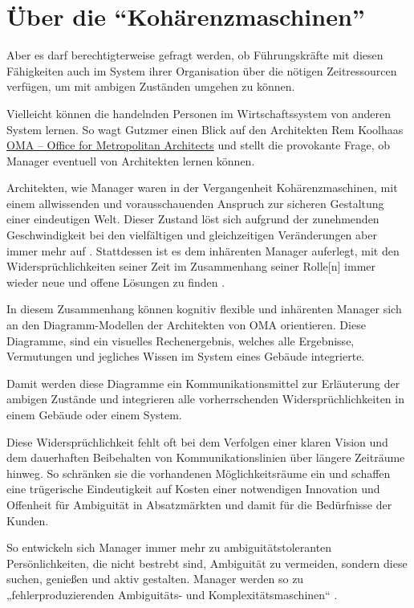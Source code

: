 \documentclass[
  ngerman,
  letterpaper,
  DIV=11]{scrartcl}
\begin{document}
\section{Über die
``Kohärenzmaschinen''}\label{uxfcber-die-kohuxe4renzmaschinen}

Aber es darf berechtigterweise gefragt werden, ob Führungskräfte mit
diesen Fähigkeiten auch im System ihrer Organisation über die nötigen
Zeitressourcen verfügen, um mit ambigen Zuständen umgehen zu können.

Vielleicht können die handelnden Personen im Wirtschaftssystem von
anderen System lernen. So wagt Gutzmer einen Blick auf den Architekten
Rem Koolhaas \href{https://www.oma.com}{OMA -- Office for Metropolitan
Architects} und stellt die provokante Frage, ob Manager eventuell von
Architekten lernen können.

Architekten, wie Manager waren in der Vergangenheit Kohärenzmaschinen,
mit einem allwissenden und vorausschauenden Anspruch zur sicheren
Gestaltung einer eindeutigen Welt. Dieser Zustand löst sich aufgrund der
zunehmenden Geschwindigkeit bei den vielfältigen und gleichzeitigen
Veränderungen aber immer mehr auf \autocite[11]{roth2019}. Stattdessen
ist es dem inhärenten Manager auferlegt, mit den Widersprüchlichkeiten
seiner Zeit im Zusammenhang seiner Rolle{[}n{]} immer wieder neue und
offene Lösungen zu finden \autocite[102]{gutzmer2020}.

In diesem Zusammenhang können kognitiv flexible und inhärenten Manager
sich an den Diagramm-Modellen der Architekten von OMA orientieren. Diese
Diagramme, sind ein visuelles Rechenergebnis, welches alle Ergebnisse,
Vermutungen und jegliches Wissen im System eines Gebäude integrierte.

Damit werden diese Diagramme ein Kommunikationsmittel zur Erläuterung
der ambigen Zustände und integrieren alle vorherrschenden
Widersprüchlichkeiten in einem Gebäude oder einem System.

Diese Widersprüchlichkeit fehlt oft bei dem Verfolgen einer klaren
Vision und dem dauerhaften Beibehalten von Kommunikationslinien über
längere Zeiträume hinweg. So schränken sie die vorhandenen
Möglichkeitsräume ein und schaffen eine trügerische Eindeutigkeit auf
Kosten einer notwendigen Innovation und Offenheit für Ambiguität in
Absatzmärkten und damit für die Bedürfnisse der Kunden.

So entwickeln sich Manager immer mehr zu ambiguitätstoleranten
Persönlichkeiten, die nicht bestrebt sind, Ambiguität zu vermeiden,
sondern diese suchen, genießen und aktiv gestalten. Manager werden so zu
„fehlerproduzierenden Ambiguitäts- und Komplexitätsmaschinen``
\autocite{gutzmer2020}.
\end{document}
